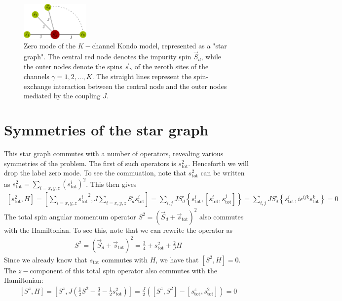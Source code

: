\documentclass[12pt]{revtex4-2}
\begin{document}
\begin{figure}[htpb]
	\centering
	\includegraphics[width=0.3\textwidth]{./stargraph.pdf}
	\caption{Zero mode of the \(K-\)channel Kondo model, represented as a "star graph". The central red node denotes the impurity spin \(\vec S_d\), while the outer nodes denote the spins \(\vec s_\gamma\) of the zeroth sites of the channels \(\gamma=1,2,\ldots,K\). The straight lines represent the spin-exchange interaction between the central node and the outer nodes mediated by the coupling \(J\).}
	\label{stargraph}
\end{figure}

\section{Symmetries of the star graph}
This star graph commutes with a number of operators, revealing various symmetries of the problem. The first of such operators is \(s_\text{tot}^2\). Henceforth we will drop the label \(\text{zero mode}\). To see the commuation, note that \(s_\text{tot}^2\) can be written as \(s_\text{tot}^2 = \sum_{i=x,y,z}\left(s_\text{tot}^i\right)^2\). This then gives
\begin{align}
\left[s_\text{tot}^2, H\right] = \left[\sum_{i=x,y,z}{s^i_\text{tot}}^2, J \sum_{i=x,y,z} S_d^i s^i_\text{tot}\right] = \sum_{i,j}J S_d^i \left\{s_\text{tot}^i, \left[s_\text{tot}^i,s_\text{tot}^j\right]\right\} = \sum_{i,j}J S_d^i \left\{s_\text{tot}^i, i \epsilon^{ijk}s^k_\text{tot}\right\} = 0
\end{align}
The total spin angular  momentum operator \(S^2 = \left(\vec S_d + \vec s_\text{tot}\right)^2 \) also commutes with the Hamiltonian. To see this, note that we can rewrite the operator as
\begin{align}
	S^2 = \left(\vec S_d + \vec s_\text{tot}\right)^2 = \frac{3}{4} + s^2_\text{tot} + \frac{2}{J} H
\end{align}
Since we already know that \(s_\text{tot}\) commutes with \(H\), we have that \(\left[S^2, H\right] = 0\). The \(z-\)component of this total spin operator also commutes with the Hamiltonian:
\begin{align}
	\left[S^z, H\right] = \left[S^z, J \left(\frac{1}{2}S^2 - \frac{3}{8} - \frac{1}{2}s_\text{tot}^2\right) \right]  = \frac{J}{2}\left(\left[S^z, S^2\right] - \left[s_\text{tot}^z, s_\text{tot}^2\right] \right) = 0
\end{align}
\end{document}
